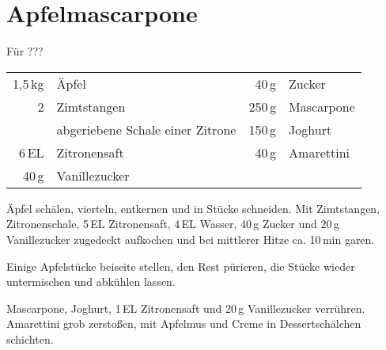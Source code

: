 \section*{Apfelmascarpone}
\begin{centering}
F\"{u}r ???
\end{centering}
\begin{table}[H]
\centering
\begin{tabular*}{1\textwidth}{rlrl}
1,5\,kg & \"{A}pfel & 40\,g & Zucker \\
2 & Zimtstangen & 250\,g & Mascarpone \\
& abgeriebene Schale einer Zitrone & 150\,g & Joghurt \\
6\,EL & Zitronensaft & 40\,g & Amarettini \\
40\,g & Vanillezucker & & \\
\end{tabular*}
\end{table}
\begin{Notes}

\item \"{A}pfel sch\"{a}len, vierteln, entkernen und in St\"{u}cke schneiden. Mit Zimtstangen, Zitronenschale, 5\,EL Zitronensaft, 4\,EL Wasser, 40\,g Zucker und 20\,g Vanillezucker zugedeckt aufkochen und bei mittlerer Hitze ca. 10\,min garen.

\item Einige Apfelst\"{u}cke beiseite stellen, den Rest p\"{u}rieren, die St\"{u}cke wieder untermischen und abk\"{u}hlen lassen.

\item Mascarpone, Joghurt, 1\,EL Zitronensaft und 20\,g Vanillezucker verrühren. Amarettini grob zerstoßen, mit Apfelmus und Creme in Dessertschälchen schichten.

\end{Notes}
